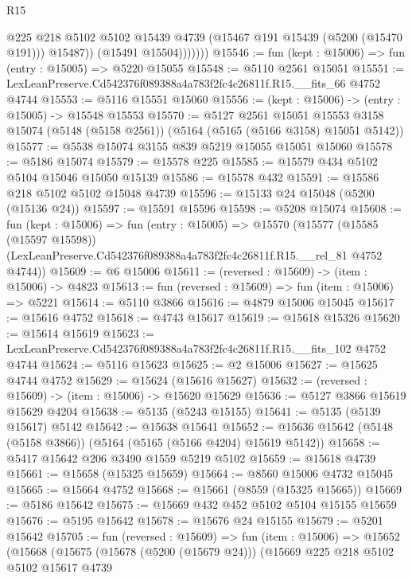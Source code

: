 \begin{lexlean}{R15}
\begin{coremodule}
{{{{{{{{{{{                    @225
                    @218
                    @5102
                    @5102
                    @15439
                    @4739
                    (@15467 @191 @15439 (@5200 (@15470 @191)))
                    @15487))
                (@15491 @15504)))))))
@15546 := fun (kept : @15006) => fun (entry : @15005) => @5220 @15055
@15548 := @5110 @2561 @15051
@15551 := LexLeanPreserve.Cd542376f089388a4a783f2fc4c26811f.R15.__fits_66 @4752 @4744
@15553 := @5116 @15551 @15060
@15556 := (kept : @15006) -> (entry : @15005) -> @15548 @15553
@15570 := @5127
    @2561
    @15051
    @15553
    @3158
    @15074
    (@5148 (@5158 @2561))
    (@5164 (@5165 (@5166 @3158) @15051 @5142))
@15577 := @5538 @15074 @3155 @839 @5219 @15055 @15051 @15060
@15578 := @5186 @15074
@15579 := @15578 @225
@15585 := @15579 @434 @5102 @5104 @15046 @15050 @15139
@15586 := @15578 @432
@15591 := @15586 @218 @5102 @5102 @15048 @4739
@15596 := @15133 @24 @15048 (@5200 (@15136 @24))
@15597 := @15591 @15596
@15598 := @5208 @15074
@15608 := fun (kept : @15006) =>
  fun (entry : @15005) =>
  @15570
    (@15577
      (@15585 (@15597 @15598))
      (LexLeanPreserve.Cd542376f089388a4a783f2fc4c26811f.R15.__rel_81 @4752 @4744))
@15609 := @6 @15006
@15611 := (reversed : @15609) -> (item : @15006) -> @4823
@15613 := fun (reversed : @15609) => fun (item : @15006) => @5221
@15614 := @5110 @3866
@15616 := @4879 @15006 @15045
@15617 := @15616 @4752
@15618 := @4743 @15617
@15619 := @15618 @15326
@15620 := @15614 @15619
@15623 := LexLeanPreserve.Cd542376f089388a4a783f2fc4c26811f.R15.__fits_102 @4752 @4744
@15624 := @5116 @15623
@15625 := @2 @15006
@15627 := @15625 @4744 @4752
@15629 := @15624 (@15616 @15627)
@15632 := (reversed : @15609) -> (item : @15006) -> @15620 @15629
@15636 := @5127 @3866 @15619 @15629 @4204
@15638 := @5135 (@5243 @15155)
@15641 := @5135 (@5139 @15617) @5142
@15642 := @15638 @15641
@15652 := @15636 @15642 (@5148 (@5158 @3866)) (@5164 (@5165 (@5166 @4204) @15619 @5142))
@15658 := @5417 @15642 @206 @3490 @1559 @5219 @5102
@15659 := @15618 @4739
@15661 := @15658 (@15325 @15659)
@15664 := @8560 @15006 @4732 @15045
@15665 := @15664 @4752
@15668 := @15661 (@8559 (@15325 @15665))
@15669 := @5186 @15642
@15675 := @15669 @432 @452 @5102 @5104 @15155 @15659
@15676 := @5195 @15642
@15678 := @15676 @24 @15155
@15679 := @5201 @15642
@15705 := fun (reversed : @15609) =>
  fun (item : @15006) =>
  @15652
    (@15668
      (@15675
        (@15678 (@5200 (@15679 @24)))
        (@15669
          @225
          @218
          @5102
          @5102
          @15617
          @4739
}}}}}}}}}}}
\end{coremodule}
\end{lexlean}
